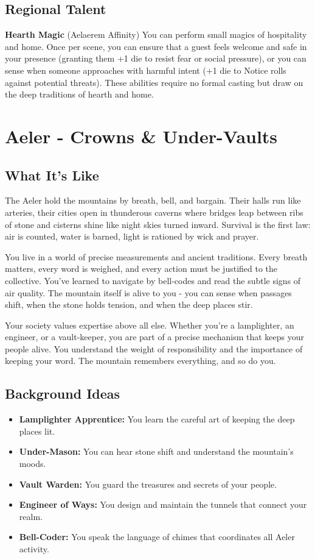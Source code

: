 \documentclass[11pt]{article}
\newcommand{\region}[1]{\section*{#1}}
\newcommand{\subregion}[1]{\subsection*{#1}}
\begin{document}
\begin{multicols}{2}
\subregion{Regional Talent}

\textbf{Hearth Magic} (Aelaerem Affinity)
You can perform small magics of hospitality and home. Once per scene, you can ensure that a guest feels welcome and safe in your presence (granting them +1 die to resist fear or social pressure), or you can sense when someone approaches with harmful intent (+1 die to Notice rolls against potential threats). These abilities require no formal casting but draw on the deep traditions of hearth and home.

\end{multicols}

\region{Aeler - Crowns \& Under-Vaults}

\begin{multicols}{2}
\subregion{What It's Like}

The Aeler hold the mountains by breath, bell, and bargain. Their halls run like arteries, their cities open in thunderous caverns where bridges leap between ribs of stone and cisterns shine like night skies turned inward. Survival is the first law: air is counted, water is barned, light is rationed by wick and prayer.

You live in a world of precise measurements and ancient traditions. Every breath matters, every word is weighed, and every action must be justified to the collective. You've learned to navigate by bell-codes and read the subtle signs of air quality. The mountain itself is alive to you - you can sense when passages shift, when the stone holds tension, and when the deep places stir.

Your society values expertise above all else. Whether you're a lamplighter, an engineer, or a vault-keeper, you are part of a precise mechanism that keeps your people alive. You understand the weight of responsibility and the importance of keeping your word. The mountain remembers everything, and so do you.

\columnbreak

\subregion{Background Ideas}

\begin{itemize}[leftmargin=*]
    \item \textbf{Lamplighter Apprentice:} You learn the careful art of keeping the deep places lit.
    \item \textbf{Under-Mason:} You can hear stone shift and understand the mountain's moods.
    \item \textbf{Vault Warden:} You guard the treasures and secrets of your people.
    \item \textbf{Engineer of Ways:} You design and maintain the tunnels that connect your realm.
    \item \textbf{Bell-Coder:} You speak the language of chimes that coordinates all Aeler activity.
\end{itemize}


\end{multicols}
\end{document}
